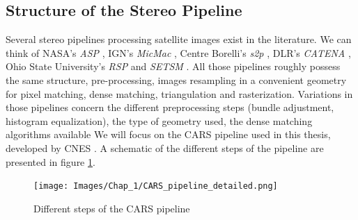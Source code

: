\subsection{Structure of the Stereo Pipeline}
Several stereo pipelines processing satellite images exist in the literature. We can think of NASA's \textit{ASP} \cite{shean_automated_2016}, IGN's \textit{MicMac} \cite{rupnik_micmac_2017}, Centre Borelli's \textit{s2p} \cite{franchis_automatic_2014}, DLR's \textit{CATENA} \cite{kraus_fully_2013}, Ohio State University's \textit{RSP} and \textit{SETSM} \cite{qin_rpc_2016, noh_surface_2017}. All those pipelines roughly possess the same structure, \ie pre-processing, images resampling in a convenient geometry for pixel matching, dense matching, triangulation and rasterization. Variations in those pipelines concern the different preprocessing steps (bundle adjustment, histogram equalization), the type of geometry used, the dense matching algorithms available \etc{} We will focus on the CARS pipeline used in this thesis, developed by CNES \cite{michel_new_2020}. A schematic of the different steps of the pipeline are presented in figure \ref{fig:cars_pipeline}.

\begin{figure}
    \centering
    \texttt{[image: Images/Chap\_1/CARS\_pipeline\_detailed.png]}
    \caption{Different steps of the CARS pipeline}
    \label{fig:cars_pipeline}
\end{figure}

